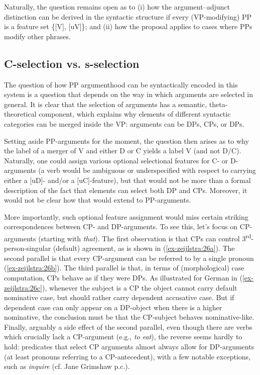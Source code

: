 \documentclass[output=paper
,modfonts
,nonflat]{langsci/langscibook}
\begin{document}
Naturally, the question remains open as to (i) how the argument–adjunct distinction can be derived in the syntactic structure if every (VP-modifying) PP is a feature set \{[V], [uV]\}; and (ii) how the proposal applies to cases where PPs modify other phrases.

\subsection{C-selection vs. s-selection}
The question of how PP argumenthood can be syntactically encoded in this system is a question that depends on the way in which arguments are selected in general. It is clear that the selection of arguments has a semantic, theta-theoretical component, which explains why elements of different syntactic categories can be merged inside the VP: arguments can be DPs, CPs, or DPs.

Setting aside PP-arguments for the moment, the question then arises as to why the label of a merger of V and either D or C yields a label V (and not D\slash C). Naturally, one could assign various optional selectional features for C- or D-ar\-gu\-ments (a verb would be ambiguous or underspecified with respect to carrying either a [uD]- and/or a [uC]-feature), but that would not be more than a formal description of the fact that elements can select both DP and CPs. Moreover, it would not be clear how that would extend to PP-arguments.

More importantly, such optional feature assignment would miss certain striking correspondences between CP- and DP-arguments. To see this, let’s focus on CP-arguments (starting with \textit{that}). The first observation is that CPs can control 3\textsuperscript{rd}-person-singular (default) agreement, as is shown in (\ref{ex-zeijlstra:26a}). The second parallel is that every CP-argument can be referred to by a single pronoun (\ref{ex-zeijlstra:26b}). The third parallel is that, in terms of (morphological) case computation, CPs behave as if they were DPs. As illustrated for German in (\ref{ex-zeijlstra:26c}), whenever the subject is a CP the object cannot carry default nominative case, but should rather carry dependent accusative case. But if dependent case can only appear on a DP-object when there is a higher nominative, the conclusion must be that the CP-subject behaves nominative-like. Finally, arguably a side effect of the second parallel, even though there are verbs which crucially lack a CP-argument (e.g., \textit{to eat}), the reverse seems hardly to hold: predicates that select CP arguments almost always allow for DP-arguments (at least pronouns referring to a CP-antecedent), with a few notable exceptions, such as \textit{inquire} (cf. Jane Grimshaw p.c.).\largerpage[-1]
\end{document}
